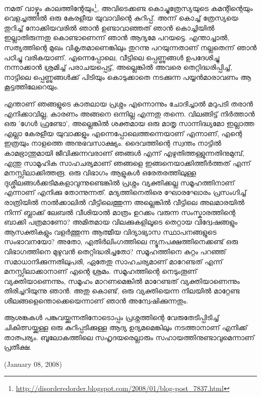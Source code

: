 \vskip 2pt

നമത് വാഴ്വും കാലത്തിന്റേയും\footnote{\url{http://disorderedorder.blogspot.com/2008/01/blog-post_7837.html}}, 
അവിടെക്കണ്ട കൊച്ചുത്രേസ്യയുടെ കമന്റിന്റെയും വെളച്ചത്തില്‍ ഒരു കേരളീയ യുവാവിന്റെ കുറിപ്പ്. 
അന്ന് കൊച്ച് ത്രേസ്യയെ തുറിച്ച് നോക്കിയവരില്‍ ഞാന്‍ ഉണ്ടാവാഞ്ഞത് ഞാന്‍ കൊച്ചിയില്‍ ഇല്ലാതിരുന്നതു 
കൊണ്ടാണെന്ന് ഞാന്‍ ആദ്യമേ പറയട്ടെ. എന്താച്ചാല്‍, സത്യത്തിന്റെ മുഖം വികൃതമാണെങ്കിലും 
തുറന്നു പറയുന്നതാണ് നല്ലതെന്ന് ഞാന്‍ പഠിച്ചു വരികയാണ്. എന്നെപ്പോലെ, വീട്ടിലെ പ്പെണ്ണുങ്ങള്‍ ഉപദേശിച്ചു 
നന്നാക്കാന്‍ ശ്രമിച്ച് പരാചയപ്പെട്ട്, അല്ലെങ്കില്‍ അവരെ തെറ്റിദ്ധരിപ്പിച്ച്, നാട്ടിലെ പ്പെണ്ണുങ്ങള്‍ക്ക് പിടിയും കൊടുക്കാതെ 
നടക്കുന്ന പയ്യന്‍മാരാവണം ആ കൂട്ടത്തിലേറെയും.

എന്താണ് ഞങ്ങളുടെ കാതലായ പ്രശ്നം എന്നൊന്നും ചോദിച്ചാല്‍ മറുപടി തരാന്‍ എനിക്കാവില്ല, കാരണം അങ്ങനെ ഒന്നില്ല 
എന്നതു തന്നെ. വിലങ്ങിട്ട് നിര്‍ത്താന്‍ ഒരു 'ഗേള്‍ ഫ്രണ്ടോ', അല്ലെങ്കില്‍ ശക്തമായ ഒരു മാതൃ സാന്നിദ്ധ്യമോ ഇല്ലാത്ത എല്ലാ 
കേരളീയ യുവാക്കളും എന്നെപ്പോലെത്തന്നെയാണ് എന്നാണ്, എന്റെ ഇത്രയും നാളത്തെ അനുഭവസാക്ഷ്യം. ദൈവത്തിന്റെ 
സ്വന്തം നാട്ടില്‍ കാമഭ്രാന്തുമായി ജീവിക്കുന്നവരാണ് ഞങ്ങള്‍ എന്ന് എഴുതിത്തള്ളുന്നതിനുമുമ്പ്, എന്തു സാമൂഹിക സാഹചര്യമാണ് 
ഞങ്ങളെ ഇങ്ങനെയാക്കിത്തീര്‍ത്തത് എന്ന് മനസ്സിലാക്കിത്തരൂ. ഒരു വിഭാഗം ആളുകള്‍ ഒരേതരത്തിലുള്ള 
ദുശ്ശീലങ്ങള്‍ക്കടിമകളാവുന്നുണ്ടെങ്കില്‍ പ്രശ്നം വ്യക്തിക്കല്ല സമൂഹത്തിനാണ് എന്നാണ് എനിക്കു തോന്നുന്നത്. 
മദ്യത്തിനെതിരെ ഘോരഘോരം പ്രസംഗിച്ച് രാത്രിയില്‍ നാല്‍ക്കാലില്‍ വീട്ടിലെത്തുന്ന അല്ലെങ്കില്‍ വീട്ടിലെ അലമാരയില്‍ 
നിന്ന് ബ്ലാക്ക് ലേബല്‍ വീശിയാല്‍ മാത്രം ഉറക്കം വരുന്ന സംസ്കാരത്തിന്റെ ബാക്കി പത്രമാണോ? അമിതമായ 
വിലക്കുകളിലൂടെ തെറ്റായ വിദ്വേഷങ്ങളും ആസക്തികളും വളര്‍ത്തുന്ന ആത്മീയ വിദ്യാഭ്യാസ സ്ഥാപനങ്ങളുടെ 
സംഭാവനയോ? അതോ, എതിര്‍ലിംഗത്തിലെ ന്യൂനപക്ഷത്തിനെക്കണ്ട് ഒരു വിഭാഗത്തിനെ മുഴുവന്‍ തെറ്റിദ്ധരിച്ചതോ? 
സമൂഹത്തിനെ കുറ്റം പറഞ്ഞ് സമാധാനിക്കുന്നതിലുപരി, ഏതേതു സാഹചര്യമാണ് മാറേണ്ടത് എന്ന് മനസ്സിലാക്കാനാണ് 
എന്റെ ശ്രമം. സമൂഹത്തിന്റെ നെടുംതൂണ് വ്യക്തിയാണെന്നും, സമൂഹം മാറണമെങ്കില്‍ മാറേണ്ടത് 
വ്യക്തിയാണെന്നും തിരിച്ചറിയുന്നു ഞാന്‍. അതു കൊണ്ട്, ഒരു വ്യക്തിയെന്ന നിലയില്‍ മാറ്റേണ്ട 
ശീലങ്ങളെന്തൊക്കെയെന്നാണ് ഞാന്‍ അന്വേഷിക്കുന്നതും.

ആശങ്കകള്‍ പങ്കുവയ്ക്കുന്നതിനോടൊപ്പം പ്രശ്നത്തിന്റെ വേരുതേടിപ്പിടിച്ച് ചികിത്സയ്ക്കുള്ള ഒരു കുറിപ്പടിക്കുള്ള ആദ്യ 
ഉദ്യമമെങ്കിലും നടത്താനാണ് എനിക്ക് താത്പര്യം. ബൂലോകത്തിലെ സഹൃദയരെല്ലാരും സഹായത്തിനുണ്ടാവുമെന്നാണ് പ്രതീക്ഷ.

(January 08, 2008)
\newpage
